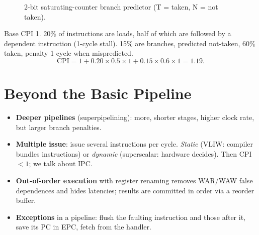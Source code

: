 \begin{figure}[H]
\centering
{}
\caption{2-bit saturating-counter branch predictor (T = taken, N = not taken).}
\end{figure}

\begin{example}
Base CPI 1. 20\% of instructions are loads, half of which are followed by a
dependent instruction (1-cycle stall). 15\% are branches, predicted
not-taken, 60\% taken, penalty 1 cycle when mispredicted.
\[
\text{CPI} = 1 + 0.20 \times 0.5 \times 1 + 0.15 \times 0.6 \times 1 = 1.19.
\]
\end{example}

\section{Beyond the Basic Pipeline}

\begin{itemize}
  \item \textbf{Deeper pipelines} (superpipelining): more, shorter stages,
    higher clock rate, but larger branch penalties.
  \item \textbf{Multiple issue}: issue several instructions per cycle.
    \emph{Static} (VLIW: compiler bundles instructions) or \emph{dynamic}
    (superscalar: hardware decides). Then CPI $< 1$; we talk about IPC.
  \item \textbf{Out-of-order execution} with register renaming removes
    WAR/WAW false dependences and hides latencies; results are committed in
    order via a reorder buffer.
  \item \textbf{Exceptions} in a pipeline: flush the faulting instruction and
    those after it, save its PC in EPC, fetch from the handler.
\end{itemize}

